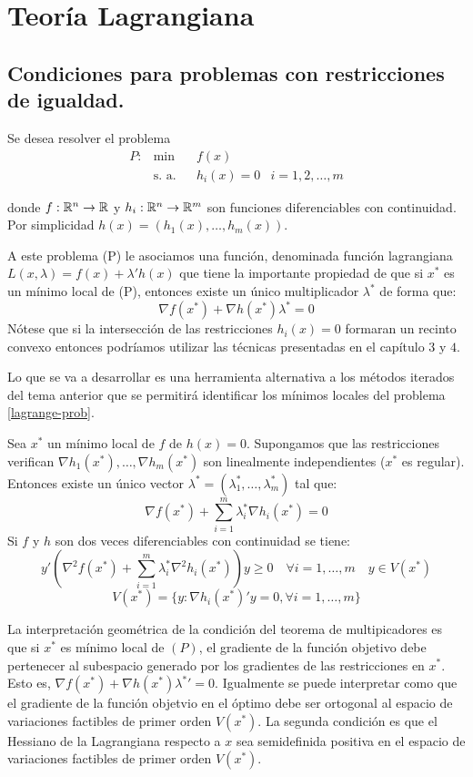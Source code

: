 \documentclass[PM.tex]{subfiles}
\begin{document}
\chapter{Teoría Lagrangiana}
\section{Condiciones para problemas con restricciones de igualdad.}

Se desea resolver el problema
\begin{equation}\label{lagrange-prob}
\begin{aligned}
P: & \min
& & f(x) \\
& \text{s. a.}
& & h_i(x) = 0 & i = 1,2,\dots,m
\end{aligned}
\end{equation}

donde $f : \mathbb{R}^n \to \mathbb{R}$ y $h_i : \mathbb{R}^n \to \mathbb{R}^m$ son funciones diferenciables con continuidad. Por simplicidad $h(x) = (h_1(x),\dots,h_m(x))$.

A este problema (P) le asociamos una función, denominada función lagrangiana $L(x,λ) = f(x) + λ'h(x)$ que tiene la importante propiedad de que si $x^*$ es un mínimo local de (P), entonces existe un único multiplicador $λ^*$ de forma que:
\[ \nabla f(x^*) + \nabla h(x^*) λ^* = 0 \]
Nótese que si la intersección de las restricciones $h_i(x) = 0$ formaran un recinto convexo entonces podríamos utilizar las técnicas presentadas en el capítulo $3$ y $4$.

Lo que se va a desarrollar es una herramienta alternativa a los métodos iterados del tema anterior que se permitirá identificar los mínimos locales del problema \eqref{lagrange-prob}.

\begin{theorem} Sea $x^*$ un mínimo local de $f$ de $h(x) = 0$. Supongamos que las restricciones verifican $\nabla h_1(x^*),\dots,\nabla h_m(x^*)$ son linealmente independientes ($x^*$ es regular). Entonces existe un único vector
$λ^* = (λ^*_1, \dots, λ^*_m)$ tal que:
\[ \nabla f(x^*) + \sum_{i=1}^m λ^*_i \nabla h_i(x^*) = 0 \]
Si $f$ y $h$ son dos veces diferenciables con continuidad se tiene:
\[ y'(\nabla^2 f(x^*) + \sum_{i=1}^m λ^*_i \nabla^2 h_i(x^*))y ≥ 0 \quad \forall i = 1,\dots,m \quad y \in V(x^*) \]
\[ V(x^*) = \{y : \nabla h_i(x^*)'y = 0, \forall i = 1,\dots,m\} \]
\end{theorem}

La interpretación geométrica de la condición del teorema de multipicadores es que si $x^*$ es mínimo local de $(P)$, el gradiente de la función objetivo debe pertenecer al subespacio generado por los gradientes de las restricciones en $x^*$. Esto es, $\nabla f(x^*)+\nabla h(x^*) {λ^*}' = 0$. Igualmente se puede interpretar como que el gradiente de la función objetvio en el óptimo debe ser ortogonal al espacio de variaciones factibles de primer orden $V(x^*)$. La segunda condición es que el Hessiano de la Lagrangiana respecto a $x$ sea semidefinida positiva en el espacio de variaciones factibles de primer orden $V(x^*)$.
\end{document}
